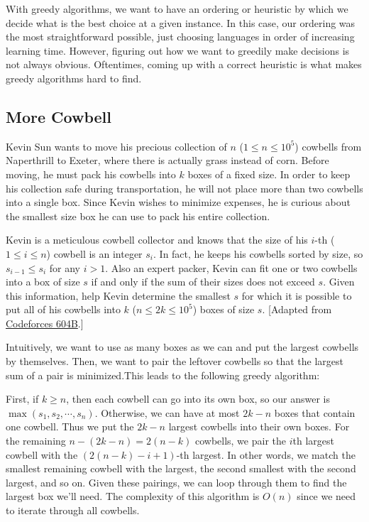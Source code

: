 With greedy algorithms, we want to have an ordering or heuristic by which we decide what is the best choice at a given instance. In this case, our ordering was the most straightforward possible, just choosing languages in order of increasing learning time. However, figuring out how we want to greedily make decisions is not always obvious. Oftentimes, coming up with a correct heuristic is what makes greedy algorithms hard to find.

\subsection{More Cowbell}

\begin{typewriter}
  Kevin Sun wants to move his precious collection of $n$ ($1\le n\le 10^5$) cowbells from Naperthrill to Exeter, where there is actually grass instead of corn. Before moving, he must pack his cowbells into $k$ boxes of a fixed size. In order to keep his collection safe during transportation, he will not place more than two cowbells into a single box. Since Kevin wishes to minimize expenses, he is curious about the smallest size box he can use to pack his entire collection.

  Kevin is a meticulous cowbell collector and knows that the size of his $i$-th ($1\le i\le n$) cowbell is an integer $s_i$. In fact, he keeps his cowbells sorted by size, so $s_{i - 1}\le s_i$ for any $i > 1$. Also an expert packer, Kevin can fit one or two cowbells into a box of size $s$ if and only if the sum of their sizes does not exceed $s$. Given this information, help Kevin determine the smallest $s$ for which it is possible to put all of his cowbells into $k$ ($n\le 2k\le 10^5$) boxes of size $s$. [Adapted from \href{http://codeforces.com/problemset/problem/604/B}{Codeforces 604B}.]
\end{typewriter}

Intuitively, we want to use as many boxes as we can and put the largest cowbells by themselves. Then, we want to pair the leftover cowbells so that the largest sum of a pair is minimized.This leads to the following greedy algorithm:

First, if $k \ge n$, then each cowbell can go into its own box, so our answer is $\max(s_1, s_2, \cdots, s_n)$. Otherwise, we can have at most $2k-n$ boxes that contain one cowbell. Thus we put the $2k-n$ largest cowbells into their own boxes. For the remaining $n-(2k-n) = 2(n-k)$ cowbells, we pair the $i$th largest cowbell with the $(2(n-k) - i + 1)$-th largest. In other words, we match the smallest remaining cowbell with the largest, the second smallest with the second largest, and so on. Given these pairings, we can loop through them to find the largest box we'll need. The complexity of this algorithm is $O(n)$ since we need to iterate through all cowbells.

